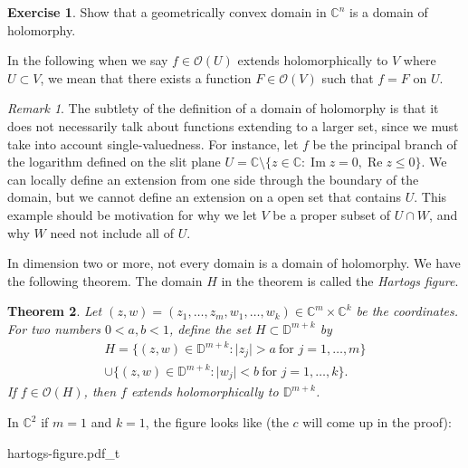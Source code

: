 \documentclass[12pt,openany]{book}
\renewcommand{\Re}{\operatorname{Re}}
\renewcommand{\Im}{\operatorname{Im}}
\newcommand{\sabs}[1]{\lvert {#1} \rvert}
\newcommand{\C}{{\mathbb{C}}}
\newcommand{\D}{{\mathbb{D}}}
\newcommand{\sO}{{\mathscr{O}}}
\newcommand{\myindex}[1]{#1\index{#1}}
\theoremstyle{plain}
\newtheorem{thm}{Theorem}[section]
\theoremstyle{remark}
\newtheorem{remark}[thm]{Remark}
\theoremstyle{definition}
\newenvironment{exbox}{%
    \def\FrameCommand{\vrule width 1pt \relax\hspace{10pt}}%
    \MakeFramed {\advance \hsize -\width \FrameRestore}%
}{%
    \endMakeFramed
}
\newenvironment{myfig}{%
    \begin{center}
}{%
    \end{center}
}
\theoremstyle{exercise}
\newtheorem{exercise}{Exercise}[section]
\theoremstyle{example}
\begin{document}
\begin{exbox}
\begin{exercise}
Show that a geometrically convex domain in $\C^n$ is a domain of holomorphy.
\end{exercise}
\end{exbox}

In the following when we say $f \in \sO(U)$ extends holomorphically to $V$ where
$U \subset V$, we mean that there
exists a function $F \in \sO(V)$ such that $f = F$ on
$U$.

\begin{remark}
The subtlety of the definition of a domain of holomorphy is that it does not
necessarily talk about functions extending to a larger set, since we must
take into account single-valuedness.  For instance, let $f$ be the principal branch
of the logarithm defined on the slit plane
$U = \C \setminus \{ z \in \C : \Im z = 0, \Re z \leq 0 \}$.
We can locally define an extension from one side through the boundary
of the domain, but we cannot define an extension on a open set that
contains $U$.  This example should be motivation for why we let $V$ 
be a proper subset of $U \cap W$, and why $W$ need not include all of $U$.
\end{remark}

In dimension two or more, not every domain is a domain of holomorphy.  We have
the following theorem.  The domain $H$ in the theorem is called the
\emph{\myindex{Hartogs figure}}.

\begin{thm} \label{thm:extensionhartogsfigure}
Let $(z,w) = (z_1,\ldots,z_m,w_{1},\ldots,w_{k}) \in \C^m \times \C^k$ be the coordinates.  For two numbers
$0 < a,b < 1$, define the set $H \subset \D^{m+k}$
by
\begin{multline*}
H = \bigl\{ (z,w) \in \D^{m+k} : \sabs{z_j} > a ~\text{for $j=1,\ldots,m$}
\bigr\}
\\
\cup
\bigl\{ (z,w) \in \D^{m+k} : \sabs{w_j} < b ~\text{for $j=1,\ldots,k$}
\bigr\} .
\end{multline*}
If $f \in \sO(H)$, then $f$ extends holomorphically to $\D^{m+k}$.
\end{thm}

\begin{samepage}
In $\C^2$ if $m=1$ and $k=1$, the figure looks like (the $c$ will come up in
the proof):

\newcommand{\hartogstext}{\parbox[t]{2.3in}{In diagrams, the Hartogs figure is
often drawn as:}}

\begin{myfig}
{hartogs-figure.pdf_t}
\end{myfig}
\end{samepage}
\end{document}
